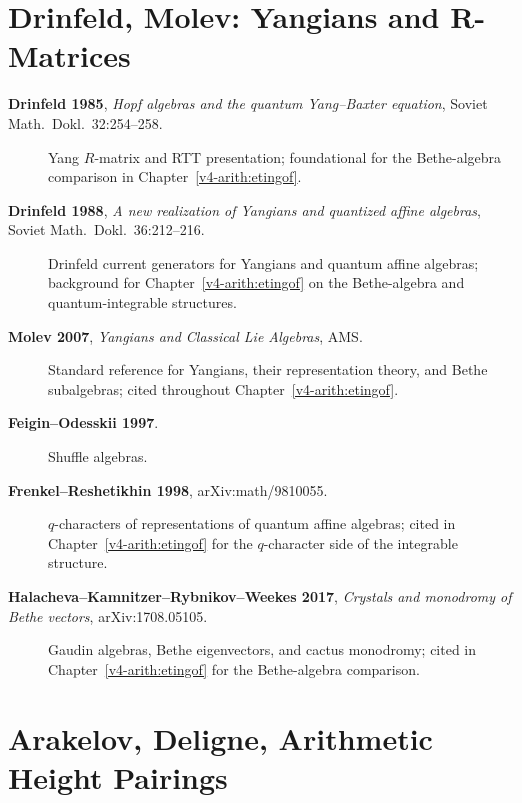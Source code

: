 \section{Drinfeld, Molev: Yangians and R-Matrices}
\label{v4-arith:app:A:yangians}

\begin{description}
\item[\textbf{Drinfeld 1985}, \emph{Hopf algebras and the quantum
Yang--Baxter equation}, Soviet Math.~Dokl.~32:254--258.]
Yang \(R\)-matrix and RTT presentation; foundational for the
Bethe-algebra comparison in Chapter~\ref{v4-arith:etingof}.
\item[\textbf{Drinfeld 1988}, \emph{A new realization of Yangians
and quantized affine algebras}, Soviet Math.~Dokl.~36:212--216.]
Drinfeld current generators for Yangians and quantum affine algebras;
background for Chapter~\ref{v4-arith:etingof} on the Bethe-algebra
and quantum-integrable structures.
\item[\textbf{Molev 2007}, \emph{Yangians and Classical Lie
Algebras}, AMS.] Standard reference for Yangians, their
representation theory, and Bethe subalgebras; cited throughout
Chapter~\ref{v4-arith:etingof}.
\item[\textbf{Feigin--Odesskii 1997}.]
Shuffle algebras.
\item[\textbf{Frenkel--Reshetikhin 1998}, arXiv:math/9810055.]
\(q\)-characters of representations of quantum affine algebras;
cited in Chapter~\ref{v4-arith:etingof} for the \(q\)-character
side of the integrable structure.
\item[\textbf{Halacheva--Kamnitzer--Rybnikov--Weekes 2017},
\emph{Crystals and monodromy of Bethe vectors}, arXiv:1708.05105.]
Gaudin algebras, Bethe eigenvectors, and cactus monodromy; cited in
Chapter~\ref{v4-arith:etingof} for the Bethe-algebra comparison.
\end{description}

\section{Arakelov, Deligne, Arithmetic Height Pairings}
\label{v4-arith:app:A:arakelov}

